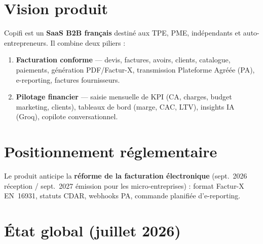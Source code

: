 \documentclass[11pt,a4paper]{report}
\newcommand{\feat}[1]{\textbf{#1}}
\begin{document}
\section{Vision produit}

Copifi est un \textbf{SaaS B2B français} destiné aux TPE, PME, indépendants et auto-entrepreneurs.
Il combine deux piliers :

\begin{enumerate}[leftmargin=1.5em]
    \item \feat{Facturation conforme} — devis, factures, avoirs, clients, catalogue, paiements,
    génération PDF/Factur-X, transmission Plateforme Agréée (PA), e-reporting, factures fournisseurs.
    \item \feat{Pilotage financier} — saisie mensuelle de KPI (CA, charges, budget marketing, clients),
    tableaux de bord (marge, CAC, LTV), insights IA (Groq), copilote conversationnel.
\end{enumerate}

\section{Positionnement réglementaire}

Le produit anticipe la \textbf{réforme de la facturation électronique} (sept.\ 2026 réception / sept.\ 2027 émission pour les micro-entreprises) :
format Factur-X EN~16931, statuts CDAR, webhooks PA, commande planifiée d'e-reporting.

\section{État global (juillet 2026)}
\end{document}
